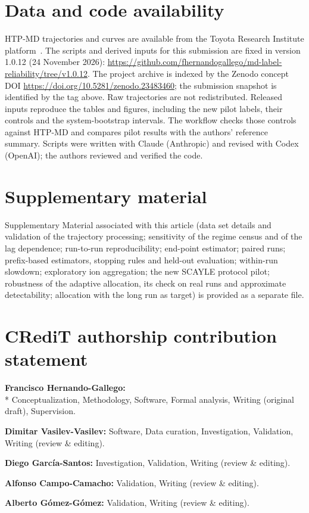 \documentclass[preprint,12pt]{elsarticle}
\begin{document}

\section*{Data and code availability}
HTP-MD trajectories and curves are available from the Toyota Research Institute
platform~\cite{Xie2023HTPMD}. The scripts and derived inputs for this submission are fixed in
version 1.0.12 (24 November 2026):
\url{https://github.com/fhernandogallego/md-label-reliability/tree/v1.0.12}.
The project archive is indexed by the Zenodo concept DOI
\url{https://doi.org/10.5281/zenodo.23483460}; the submission snapshot is identified by the tag above.
Raw trajectories are not redistributed. Released inputs reproduce the tables and figures,
including the \pilRuns{} new pilot labels, their controls and the system-bootstrap intervals.
The workflow checks those controls against HTP-MD and compares pilot results with the authors'
reference summary. Scripts were written with Claude (Anthropic) and revised with Codex
(OpenAI); the authors reviewed and verified the code.

\section*{Supplementary material}
Supplementary Material associated with this article (data set details and validation of the
trajectory processing; sensitivity of the regime census and of the lag dependence; run-to-run
reproducibility; end-point estimator; paired runs; prefix-based estimators, stopping rules and
held-out evaluation; within-run slowdown; exploratory ion aggregation; the new SCAYLE protocol pilot; robustness of the adaptive allocation, its check on
real runs and approximate detectability; allocation with the long run as target) is provided as a separate file.

\section*{CRediT authorship contribution statement}
\par\noindent\textbf{Francisco Hernando-Gallego:}\\*
Conceptualization, Methodology, Software, Formal analysis,
Writing (original draft), Supervision.
\par\noindent\textbf{Dimitar Vasilev-Vasilev:} Software, Data curation, Investigation, Validation, Writing
(review \& editing).
\par\noindent\textbf{Diego Garc\'ia-Santos:} Investigation, Validation, Writing (review \& editing).
\par\noindent\textbf{Alfonso Campo-Camacho:} Validation, Writing (review \& editing).
\par\noindent\textbf{Alberto G\'omez-G\'omez:} Validation, Writing (review \& editing).
\end{document}
